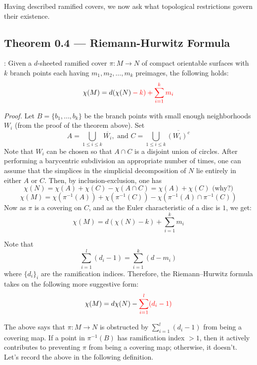\documentclass[11pt,a4paper]{article}
\begin{document}
Having described ramified covers, we now ask what topological restrictions govern their existence.

\subsection*{Theorem 0.4 — Riemann-Hurwitz Formula}: Given a $d$-sheeted ramified cover $\pi:M\rightarrow N$ of compact orientable surfaces with $k$ branch points each having $m_1, m_2, \ldots, m_k$ preimages, the following holds:
\begin{equation*}
    \chi(M) = d(\chi(N) \color{red}- {k}) + \sum_{i = 1}^{k}m_i
\end{equation*}

\textit{Proof.}
    Let $B = \{b_1, \ldots, b_k\}$ be the branch points with small enough neighborhoods $W_i$ (from the proof of the theorem above). Set
    $$A = \bigcup\limits_{1\leq i\leq k} \overline{W_i}, \text{ and } C = \bigcup\limits_{1\leq i\leq k} \overline{(W_i)^c}$$
    Note that $W_i$ can be chosen so that $A\cap C$ is a disjoint union of circles. After performing a barycentric subdivision an appropriate number of times, one can assume that the simplices in the simplicial decomposition of $N$ lie entirely in either $A$ or $C$. Then, by inclusion-exclusion, one has
    $$\chi(N) = \chi(A)+\chi(C) - \chi(A\cap C) = \chi(A)+\chi(C) \text{ (why?)}$$
    $$\chi(M) = \chi(\pi^{-1}(A)) + \chi(\pi^{-1}(C)) - \chi(\pi^{-1}(A) \cap \pi^{-1}(C))$$
    Now as $\pi$ is a covering on $C$, and as the Euler characteristic of a disc is $1$, we get:
    $$\chi(M) = d(\chi(N) - {k}) + \sum_{i = 1}^{k}m_i$$


Note that
$$\sum_{i=1}^{l}(d_i-1) = \sum_{i=1}^{k}(d - m_i)$$
where $\{d_i\}_i$ are the ramification indices. Therefore, the Riemann--Hurwitz formula takes on the following more suggestive form:
$$\chi(M) = d\chi(N) - \color{red}\sum_{i=1}^{l}(d_i-1)$$

The above says that $\pi:M\rightarrow N$ is obstructed by $\sum_{i=1}^{l}(d_i-1)$ from being a covering map. If a point in $\pi^{-1}(B)$ has ramification index $>1$, then it actively contributes to preventing $\pi$ from being a covering map; otherwise, it doesn't. Let's record the above in the following definition.
\end{document}
